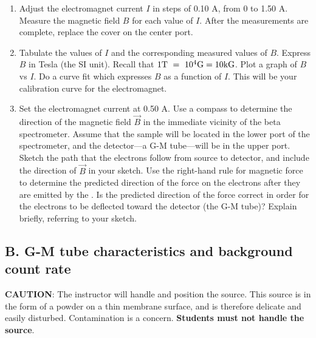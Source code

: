 \begin{enumerate}
\item Adjust the electromagnet current $I$ in steps of 0.10 A, from 0 to
1.50 A.  Measure the magnetic field $B$ for each value of $I$.  After the
measurements are complete, replace the cover on the center port.

\item Tabulate the values of $I$ and the corresponding measured
values of $B$.  Express $B$ in Tesla (the SI unit).  Recall that 
$1 {\rm T } ~=~ 10^4 {\rm G} = 10 {\rm kG}$.  Plot a graph of $B$
vs $I$.  Do a curve fit which expresses $B$ as a function of $I$.  This
will be your calibration curve for the electromagnet.

\item Set the electromagnet current at 0.50 A.  Use a compass
to determine the direction of the magnetic field
$\vec{B}$ in the immediate vicinity of the beta
spectrometer.  Assume that the \cs sample will be located in the
lower port of the spectrometer, and the detector---a G-M tube---will 
be in the upper port.  Sketch the path that the electrons follow
from source to detector, and include the direction of
$\vec{B}$ in your sketch.  Use the right-hand rule
for magnetic force to determine the predicted direction of the force on
the electrons after they are emitted by the \cs.  Is the predicted
direction of the force correct in order for
the electrons to be deflected toward the detector (the G-M tube)?
Explain briefly, referring to your sketch.

\end{enumerate}

\subsection{B.  G-M tube characteristics and background count rate}

{\bf CAUTION}: The instructor will handle and
position the \cs source.  This source is in the form of a powder on
a thin membrane surface, and is therefore delicate and easily
disturbed.  Contamination is a concern.  {\bf Students must not handle the
\cs source}.

